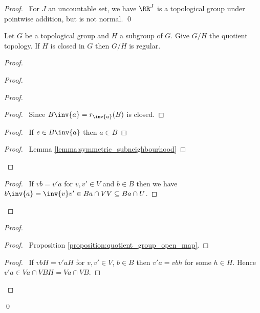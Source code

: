 \begin{proof}
    \pf\ For $J$ an uncountable set, we have $\RR^J$ is a topological group under
    pointwise addition, but is not normal. \qed
\end{proof}

\begin{proposition}
    \label{proposition:regular_quotient}
    Let $G$ be a topological group and $H$ a subgroup of $G$. Give $G / H$
    the quotient topology. If $H$ is closed in $G$ then $G / H$ is regular.
\end{proposition}

\begin{proof}
    \pf
    \begin{proof}
        \begin{proof}
            \begin{proof}
                \pf\ Since $B \inv{a} = r_{\inv{a}}(B)$ is closed.
            \end{proof}
            \begin{proof}
                \pf\ If $e \in B \inv{a}$ then $a \in B$
            \end{proof}
            \qedstep
            \begin{proof}
                \pf\ Lemma \ref{lemma:symmetric_subneighbourhood}
            \end{proof}
        \end{proof}
        \begin{proof}
            \pf\ If $vb = v'a$ for $v, v' \in V$ and $b \in B$ then we have $b\inv{a} = \inv{v}v' \in Ba \cap VV \subseteq Ba \cap U$.
        \end{proof}
    \end{proof}
    \begin{proof}
        \begin{proof}
            \pf\ Proposition \ref{proposition:quotient_group_open_map}.
        \end{proof}
        \begin{proof}
            \pf\ If $vbH = v'aH$ for $v,v' \in V$, $b \in B$ then $v'a = vbh$ for some $h \in H$. Hence $v'a \in Va \cap VBH = Va \cap VB$.
        \end{proof}
    \end{proof}
    \qed
\end{proof}

